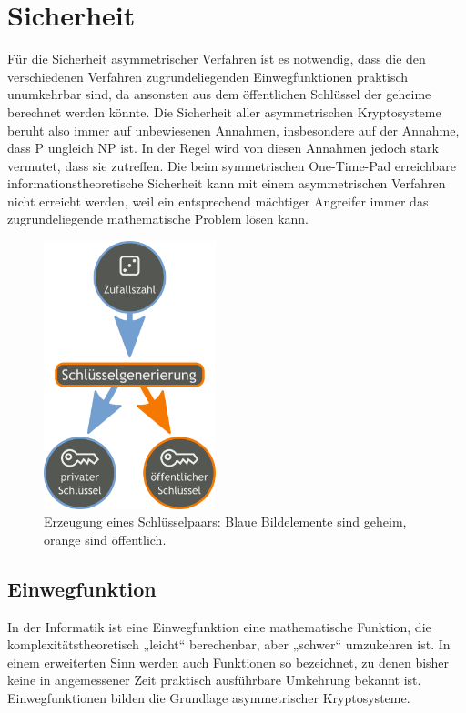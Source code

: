 
\chapter{Sicherheit}
\label{chapter-Sicherheit}
Für die Sicherheit asymmetrischer Verfahren ist es notwendig, dass die den verschiedenen Verfahren zugrundeliegenden Einwegfunktionen praktisch unumkehrbar sind, da ansonsten aus dem öffentlichen Schlüssel der geheime berechnet werden könnte. Die Sicherheit aller asymmetrischen Kryptosysteme beruht also immer auf unbewiesenen Annahmen, insbesondere auf der Annahme, dass P ungleich NP ist. In der Regel wird von diesen Annahmen jedoch stark vermutet, dass sie zutreffen. Die beim symmetrischen One-Time-Pad erreichbare informationstheoretische Sicherheit kann mit einem asymmetrischen Verfahren nicht erreicht werden, weil ein entsprechend mächtiger Angreifer immer das zugrundeliegende mathematische Problem lösen kann.
\begin{figure}
	\begin{center}
		\includegraphics[width=5cm]{abcd.png}	
	\end{center}
	\caption{Erzeugung eines Schlüsselpaars: Blaue Bildelemente sind geheim, orange sind öffentlich.}
	
\end{figure}

\section{Einwegfunktion}
In der Informatik ist eine Einwegfunktion eine mathematische Funktion, die komplexitätstheoretisch „leicht“ berechenbar, aber „schwer“ umzukehren ist. In einem erweiterten Sinn werden auch Funktionen so bezeichnet, zu denen bisher keine in angemessener Zeit praktisch ausführbare Umkehrung bekannt ist.
Einwegfunktionen bilden die Grundlage asymmetrischer Kryptosysteme.

